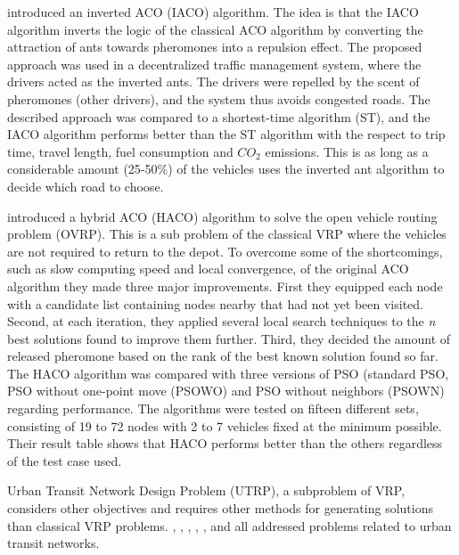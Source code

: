 \citet{dias14} introduced an inverted ACO (IACO) algorithm. The idea is that the IACO algorithm inverts the logic of the classical ACO algorithm by converting the attraction of ants towards pheromones into a repulsion effect. The proposed approach was used in a decentralized traffic management system, where the drivers acted as the inverted ants. The drivers were repelled by the scent of pheromones (other drivers), and the system thus avoids congested roads. The described approach was compared to a shortest-time algorithm (ST), and the IACO algorithm performs better than the ST algorithm with the respect to trip time, travel length, fuel consumption and $CO_2$ emissions. This is as long as a considerable amount (25-50\%) of the vehicles uses the inverted ant algorithm to decide which road to choose. 

\citet{sedighpour14} introduced a hybrid ACO (HACO) algorithm to solve the open vehicle routing problem (OVRP). This is a sub problem of the classical VRP where the vehicles are not required to return to the depot. To overcome some of the shortcomings, such as slow computing speed and local convergence, of the original ACO algorithm they made three major improvements. First they equipped each node with a candidate list containing nodes nearby that had not yet been visited. Second, at each iteration, they applied several local search techniques to the \textit{n} best solutions found to improve them further. Third, they decided the amount of released pheromone based on the rank of the best known solution found so far. The HACO algorithm was compared with three versions of PSO (standard PSO, PSO without one-point move (PSOWO) and PSO without neighbors (PSOWN) regarding performance. The algorithms were tested on fifteen different sets, consisting of 19 to 72 nodes with 2 to 7 vehicles fixed at the minimum possible. Their result table shows that HACO performs better than the others regardless of the test case used.\newline

Urban Transit Network Design Problem (UTRP), a subproblem of VRP, considers other objectives and requires other methods for generating solutions than classical VRP problems. \citet{yang07}, \citet{salehinejad10}, \citet{jiang10}, \citet{poorzahedy11}, \citet{nikolic14}, and \citet{kechagiopoulos14} all addressed problems related to urban transit networks. \newline

